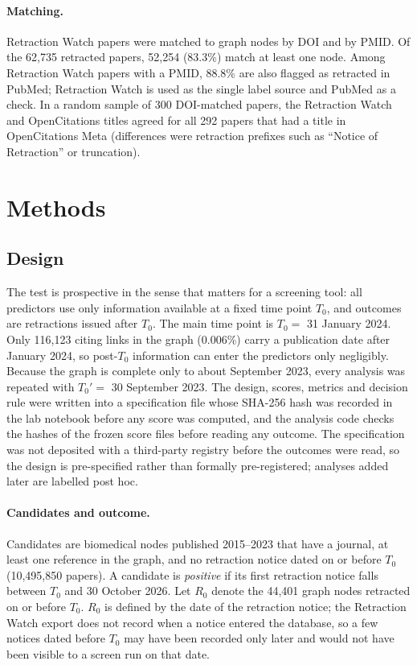 \paragraph{Matching.} Retraction Watch papers were matched to graph nodes by DOI and by PMID. Of the 62,735 retracted
papers, 52,254 (83.3\%) match at least one node. Among Retraction Watch papers with a PMID, 88.8\% are also flagged as
retracted in PubMed; Retraction Watch is used as the single label source and PubMed as a check. In a random sample of 300 DOI-matched papers,
the Retraction Watch and OpenCitations titles agreed for all 292 papers that had a title in OpenCitations Meta
(differences were retraction prefixes such as ``Notice of Retraction'' or truncation).

\section{Methods}\label{sec:methods}

\subsection{Design}
The test is prospective in the sense that matters for a screening tool: all predictors use only information available
at a fixed time point $T_0$, and outcomes are retractions issued after $T_0$. The main time point is
$T_0 = $ 31 January 2024. Only 116,123 citing links in the graph (0.006\%) carry a publication date after January 2024,
so post-$T_0$ information can enter the predictors only negligibly. Because the graph is complete only to about September 2023, every analysis was
repeated with $T_0' = $ 30 September 2023. The design, scores, metrics and decision rule were written into a
specification file whose SHA-256 hash was recorded in the lab notebook before any score was computed, and the analysis
code checks the hashes of the frozen score files before reading any outcome. The specification was not deposited with a
third-party registry before the outcomes were read, so the design is pre-specified rather than formally
pre-registered; analyses added later are labelled post hoc.

\paragraph{Candidates and outcome.} Candidates are biomedical nodes published 2015--2023 that have a journal, at least
one reference in the graph, and no retraction notice dated on or before $T_0$ (10,495,850 papers). A candidate is
\emph{positive} if its first retraction notice falls between $T_0$ and 30 October 2026. Let $R_0$ denote the 44,401
graph nodes retracted on or before $T_0$. $R_0$ is defined by the date of the retraction notice; the Retraction
Watch export does not record when a notice entered the database, so a few notices dated before $T_0$ may have been
recorded only later and would not have been visible to a screen run on that date.

